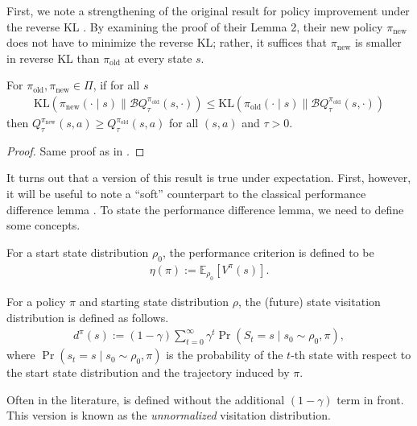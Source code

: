 \documentclass[twoside,11pt]{article}
\newcommand{\Ex}{\mathbb{E}}
\newcommand{\KL}{\mathrm{KL}}
\newcommand{\boltzmannQ}{\mathcal{B}Q}
\newcommand{\pinew}{{\pi_\mathrm{new}}}
\newcommand{\piold}{{\pi_\mathrm{old}}}
\begin{document}
First, we note a strengthening of the original result for policy improvement under the reverse KL \citep{haarnoja2018soft}. By examining the proof of their Lemma 2, their new policy $\pi_{\mathrm{new}}$ does not have to minimize the reverse KL; rather, it suffices that $\pi_{\mathrm{new}}$ is smaller in reverse KL than $\pi_{\mathrm{old}}$ at every state $s$. 
\begin{lemma}\label{lem:stronger-sac}
For $\piold, \pinew \in \Pi$, if for all $s$
\begin{align*}
    \KL(\pinew(\cdot \mid s) \parallel \boltzmannQ^\piold_\tau(s, \cdot)) \le \KL(\piold(\cdot \mid s) \parallel \boltzmannQ_\tau^\piold(s, \cdot))\nonumber
\end{align*}
then $Q^\pinew_\tau(s, a) \geq Q^\piold_\tau(s, a)$ for all $(s, a)$ and $\tau > 0$.
\end{lemma}
\begin{proof}
Same proof as in \citet{haarnoja2018soft}.
\end{proof}
It turns out that a version of this result is true under expectation. First, however, it will be useful to note a ``soft'' counterpart to the classical performance difference lemma \citep{kakade2002approximately}. To state the performance difference lemma, we need to define some concepts. 
\begin{definition}\label{def:perf-criterion}
For a start state distribution $\rho_0$, the performance criterion is defined to be
\begin{align*}
    \eta(\pi) := \Ex_{\rho_0}[V^\pi(s)].
\end{align*}
\end{definition}

\begin{definition}\label{def:d_pi}
For a policy $\pi$ and starting state distribution $\rho$, the (future) state visitation distribution is defined as follows.
\begin{align*}
    d^\pi(s) := (1 - \gamma) \sum_{t = 0}^\infty \gamma^t \Pr(S_t = s \mid s_0 \sim \rho_0, \pi),
\end{align*}
where $\Pr(s_t = s \mid s_0 \sim \rho_0, \pi)$ is the probability of the $t$-th state with respect to the start state distribution and the trajectory induced by $\pi$. 
\end{definition}
Often in the literature,  is defined without the additional $(1 - \gamma)$ term in front. This version is known as the \textit{unnormalized} visitation distribution.
\end{document}
